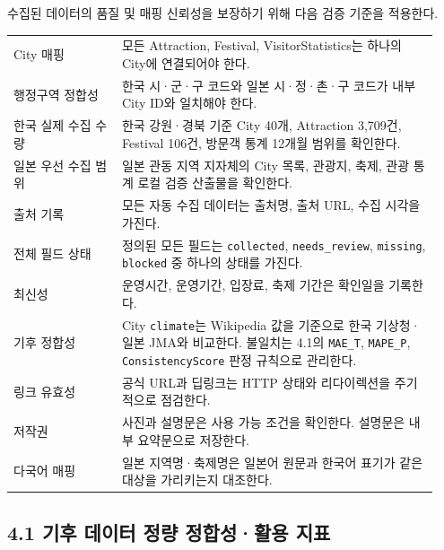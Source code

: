 \documentclass[12pt,a4paper]{article}
\newcommand{\DocNeedspace}[1]{\par\ifdim\dimexpr\pagegoal-\pagetotal\relax<#1\newpage\fi}
\begin{document}
\DocNeedspace{3\baselineskip}
수집된 데이터의 품질 및 매핑 신뢰성을 보장하기 위해 다음 검증 기준을 적용한다.


\DocNeedspace{28\baselineskip}
\begin{small}
\begin{longtable}{@{}>{\centering\arraybackslash}m{0.240\linewidth}>{\RaggedRight\arraybackslash}m{0.700\linewidth}@{}}
\toprule
\multicolumn{1}{>{\centering\arraybackslash}m{0.240\linewidth}}{\textbf{검증 항목}} & \multicolumn{1}{>{\centering\arraybackslash}m{0.700\linewidth}}{\textbf{기준}} \\
\midrule
\endhead
City 매핑 & 모든 Attraction, Festival, VisitorStatistics는 하나의 City에 연결되어야 한다. \\
행정구역 정합성 & 한국 시·군·구 코드와 일본 시·정·촌·구 코드가 내부 City ID와 일치해야 한다. \\
한국 실제 수집 수량 & 한국 강원·경북 기준 City 40개, Attraction 3,709건, Festival 106건, 방문객 통계 12개월 범위를 확인한다. \\
일본 우선 수집 범위 & 일본 관동 지역 지자체의 City 목록, 관광지, 축제, 관광 통계 로컬 검증 산출물을 확인한다. \\
출처 기록 & 모든 자동 수집 데이터는 출처명, 출처 URL, 수집 시각을 가진다. \\
전체 필드 상태 & 정의된 모든 필드는 \texttt{collected}, \texttt{needs\_\allowbreak{}review}, \texttt{missing}, \texttt{blocked} 중 하나의 상태를 가진다. \\
최신성 & 운영시간, 운영기간, 입장료, 축제 기간은 확인일을 기록한다. \\
기후 정합성 & City \texttt{climate}는 Wikipedia 값을 기준으로 한국 기상청·일본 JMA와 비교한다. 불일치는 4.1의 \texttt{MAE\_\allowbreak{}T}, \texttt{MAPE\_\allowbreak{}P}, \texttt{Consistency\allowbreak{}Score} 판정 규칙으로 관리한다. \\
링크 유효성 & 공식 URL과 딥링크는 HTTP 상태와 리다이렉션을 주기적으로 점검한다. \\
저작권 & 사진과 설명문은 사용 가능 조건을 확인한다. 설명문은 내부 요약문으로 저장한다. \\
다국어 매핑 & 일본 지역명·축제명은 일본어 원문과 한국어 표기가 같은 대상을 가리키는지 대조한다. \\
\bottomrule
\end{longtable}
\end{small}


\newpage
\DocNeedspace{24\baselineskip}
\subsection*{4.1 기후 데이터 정량 정합성·활용 지표}
\end{document}
